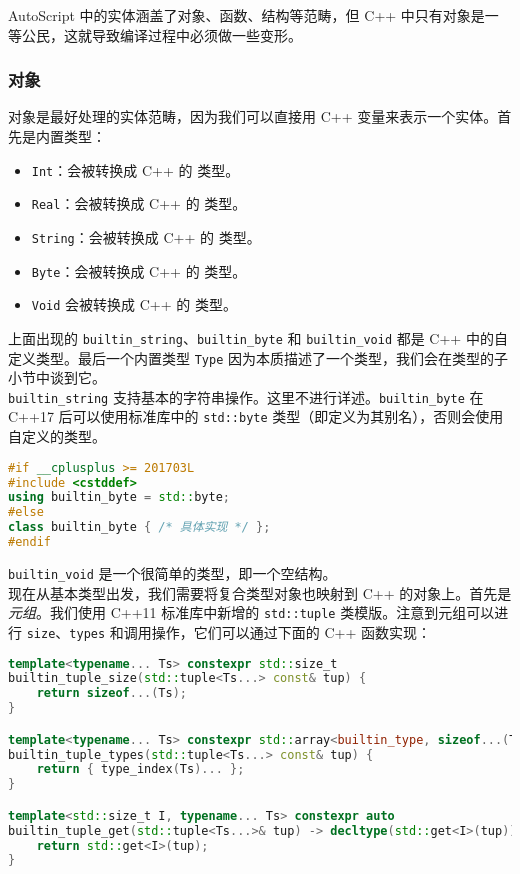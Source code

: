 AutoScript 中的实体涵盖了对象、函数、结构等范畴，但 C++ 中只有对象是一等公民，这就导致编译过程中必须做一些变形。

\subsubsection{对象}

对象是最好处理的实体范畴，因为我们可以直接用 C++ 变量来表示一个实体。首先是内置类型：

\begin{itemize}
	\item \lstinline!Int!：会被转换成 C++ 的  类型。
	\item \lstinline!Real!：会被转换成 C++ 的  类型。
	\item \lstinline!String!：会被转换成 C++ 的  类型。
	\item \lstinline!Byte!：会被转换成 C++ 的  类型。
	\item \lstinline!Void! 会被转换成 C++ 的  类型。
\end{itemize}

上面出现的 \lstinline!builtin_string!、\lstinline!builtin_byte! 和 \lstinline!builtin_void! 都是 C++ 中的自定义类型。最后一个内置类型 \lstinline!Type! 因为本质描述了一个类型，我们会在类型的子小节中谈到它。 \\

\lstinline!builtin_string! 支持基本的字符串操作。这里不进行详述。\lstinline!builtin_byte! 在 C++17 后可以使用标准库中的 \lstinline!std::byte! 类型（即定义为其别名），否则会使用自定义的类型。

\begin{lstlisting}[language=C++]
#if __cplusplus >= 201703L
#include <cstddef>
using builtin_byte = std::byte;
#else
class builtin_byte { /* 具体实现 */ };
#endif
\end{lstlisting}

\lstinline!builtin_void! 是一个很简单的类型，即一个空结构。 \\

现在从基本类型出发，我们需要将复合类型对象也映射到 C++ 的对象上。首先是\emph{元组}。我们使用 C++11 标准库中新增的 \lstinline!std::tuple! 类模版。注意到元组可以进行 \lstinline!size!、\lstinline!types! 和调用操作，它们可以通过下面的 C++ 函数实现：

\begin{lstlisting}[language=C++]
template<typename... Ts> constexpr std::size_t 
builtin_tuple_size(std::tuple<Ts...> const& tup) {
	return sizeof...(Ts);
}

template<typename... Ts> constexpr std::array<builtin_type, sizeof...(Ts)> 
builtin_tuple_types(std::tuple<Ts...> const& tup) {
	return { type_index(Ts)... };
}

template<std::size_t I, typename... Ts> constexpr auto 
builtin_tuple_get(std::tuple<Ts...>& tup) -> decltype(std::get<I>(tup)) {
	return std::get<I>(tup);
}
\end{lstlisting}

